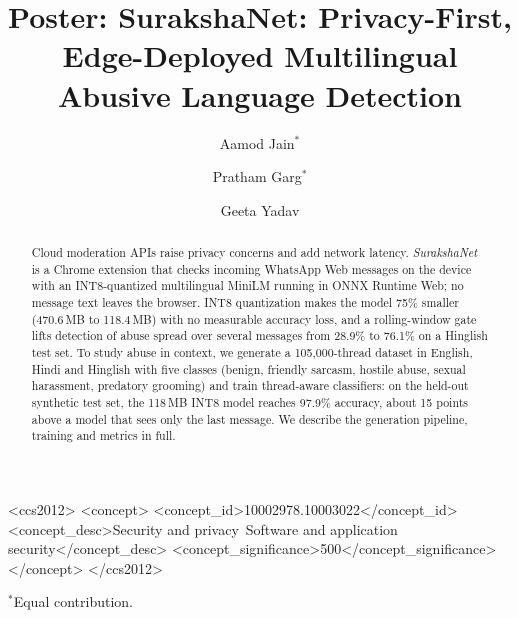 \documentclass[sigconf,9pt]{acmart}
\begin{document}
\title{Poster: SurakshaNet: Privacy-First, Edge-Deployed Multilingual Abusive Language Detection}

\author{Aamod Jain$^{*}$}
\author{Pratham Garg$^{*}$}
\author{Geeta Yadav}

\begin{abstract}
Cloud moderation APIs raise privacy concerns and add network latency. \textit{SurakshaNet} is a Chrome extension that checks incoming WhatsApp Web messages on the device with an INT8-quantized multilingual MiniLM running in ONNX Runtime Web; no message text leaves the browser. INT8 quantization makes the model 75\% smaller (470.6\,MB to 118.4\,MB) with no measurable accuracy loss, and a rolling-window gate lifts detection of abuse spread over several messages from 28.9\% to 76.1\% on a Hinglish test set. To study abuse in context, we generate a 105{,}000-thread dataset in English, Hindi and Hinglish with five classes (benign, friendly sarcasm, hostile abuse, sexual harassment, predatory grooming) and train thread-aware classifiers: on the held-out synthetic test set, the 118\,MB INT8 model reaches 97.9\% accuracy, about 15 points above a model that sees only the last message. We describe the generation pipeline, training and metrics in full.
\end{abstract}

\begin{CCSXML}
<ccs2012>
   <concept>
       <concept_id>10002978.10003022</concept_id>
       <concept_desc>Security and privacy~Software and application security</concept_desc>
       <concept_significance>500</concept_significance>
       </concept>
 </ccs2012>
\end{CCSXML}

\maketitle
\vspace{-0.5em}
$^{*}$Equal contribution.
\end{document}
